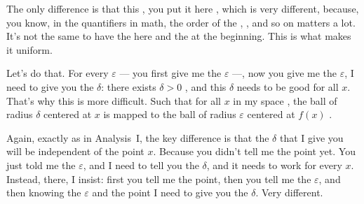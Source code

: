 \begin{speech}[00:07:38 - 00:09:32]
The only difference is that this , you put it here , which is very different, because, you know, in the quantifiers in math, the order of the , , and so on matters a lot. It's not the same to have the  here and the  at the beginning. This is what makes it uniform.

Let's do that. For every $\varepsilon$ --- you first give me the $\varepsilon$  ---, now you give me the $\varepsilon$, I need to give you the $\delta$: there exists $\delta > 0$ , and this $\delta$ needs to be good for all $x$. That's why this is more difficult. Such that for all $x$ in my space , the ball of radius $\delta$ centered at $x$ is mapped to the ball of radius $\varepsilon$ centered at $f(x)$ .

Again, exactly as in Analysis~I, the key difference is that the $\delta$ that I give you will be independent of the point $x$. Because you didn't tell me the point yet. You just told me the $\varepsilon$, and I need to tell you the $\delta$, and it needs to work for every $x$. Instead, there, I insist: first you tell me the point, then you tell me the $\varepsilon$, and then knowing the $\varepsilon$ and the point I need to give you the $\delta$. Very different.
\end{speech}


